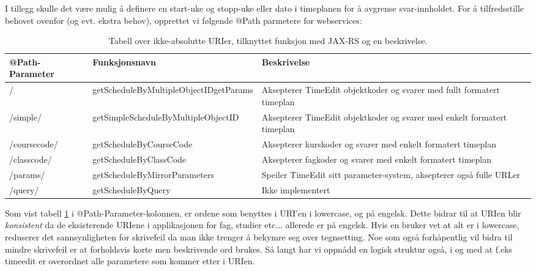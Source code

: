 \documentclass[../main.tex]{subfiles}
\begin{document}
I tillegg skulle det være mulig å definere en start-uke og stopp-uke eller dato i timeplanen for å avgrense svar-innholdet.\newline
For å tilfredsstille behovet ovenfor (og evt. ekstra behov), opprettet vi følgende @Path parmetere for webservices:

\begin{table}[H]
\begin{center}
\caption{Tabell over ikke-absolutte URIer, tilknyttet funksjon med JAX-RS og en beskrivelse.}
\label{table:timeeditd}
  \begin{tabular}{ | p{4cm} | p{6cm} | p{6cm} |}
    \hline
    @Path-Parameter & Funksjonsnavn & Beskrivelse \\ \hline
/ & getScheduleByMultipleObjectID\newline getParams & Aksepterer TimeEdit objektkoder og svarer med fullt formatert timeplan \\ \hline
/simple/ & getSimpleScheduleByMultipleObjectID & Aksepterer TimeEdit objektkoder og svarer med enkelt formatert timeplan \\ \hline
/coursecode/ & getScheduleByCourseCode & Aksepterer kurskoder og svarer med enkelt formatert timeplan \\ \hline
/classcode/ & getScheduleByClassCode & Aksepterer fagkoder og svarer med enkelt formatert timeplan \\ \hline
/params/ & getScheduleByMirrorParameters & Speiler TimeEdit sitt parameter-system, aksepterer også fulle URLer \\ \hline
/query/ & getScheduleByQuery & Ikke implementert \\
    \hline
  \end{tabular}
\end{center}
\end{table}

Som vist tabell \ref{table:timeeditd}  i @Path-Parameter-kolonnen, er ordene som benyttes i URI'en i lowercase, og på engelsk. Dette bidrar til at URIen blir \textit{konsistent} da de eksisterende URIene i applikasjonen for fag, studier etc... allerede er på engelsk. Hvis en bruker vet at alt er i lowercase, reduserer det sannsynligheten for skrivefeil da man ikke trenger å bekymre seg over tegnsetting. Noe som også forhåpentlig vil bidra til mindre skrivefeil er at forholdsvis korte men beskrivende ord brukes. Så langt har vi oppnådd en logisk struktur også, i og med at f.eks timeedit er overordnet alle parametere som kommer etter i URIen.
\end{document}
